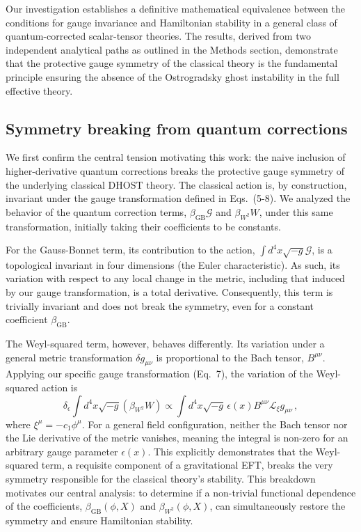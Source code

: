 \documentclass[twocolumn]{aastex631}
\begin{document}
Our investigation establishes a definitive mathematical equivalence between the conditions for gauge invariance and Hamiltonian stability in a general class of quantum-corrected scalar-tensor theories. The results, derived from two independent analytical paths as outlined in the Methods section, demonstrate that the protective gauge symmetry of the classical theory is the fundamental principle ensuring the absence of the Ostrogradsky ghost instability in the full effective theory.

\subsection{Symmetry breaking from quantum corrections}

We first confirm the central tension motivating this work: the naive inclusion of higher-derivative quantum corrections breaks the protective gauge symmetry of the underlying classical DHOST theory. The classical action is, by construction, invariant under the gauge transformation defined in Eqs.~(5-8). We analyzed the behavior of the quantum correction terms, $\beta_{\text{GB}}\mathcal{G}$ and $\beta_{W^2}W$, under this same transformation, initially taking their coefficients to be constants.

For the Gauss-Bonnet term, its contribution to the action, $\int d^4x \sqrt{-g} \mathcal{G}$, is a topological invariant in four dimensions (the Euler characteristic). As such, its variation with respect to any local change in the metric, including that induced by our gauge transformation, is a total derivative. Consequently, this term is trivially invariant and does not break the symmetry, even for a constant coefficient $\beta_{\text{GB}}$.

The Weyl-squared term, however, behaves differently. Its variation under a general metric transformation $\delta g_{\mu\nu}$ is proportional to the Bach tensor, $B^{\mu\nu}$. Applying our specific gauge transformation (Eq.~7), the variation of the Weyl-squared action is
\begin{equation}
    \delta_\epsilon \int d^4x \sqrt{-g} (\beta_{W^2} W) \propto \int d^4x \sqrt{-g} \, \epsilon(x) B^{\mu\nu} \mathcal{L}_{\xi} g_{\mu\nu} \,,
\end{equation}
where $\xi^\mu = -c_1 \phi^\mu$. For a general field configuration, neither the Bach tensor nor the Lie derivative of the metric vanishes, meaning the integral is non-zero for an arbitrary gauge parameter $\epsilon(x)$. This explicitly demonstrates that the Weyl-squared term, a requisite component of a gravitational EFT, breaks the very symmetry responsible for the classical theory's stability. This breakdown motivates our central analysis: to determine if a non-trivial functional dependence of the coefficients, $\beta_{\text{GB}}(\phi, X)$ and $\beta_{W^2}(\phi, X)$, can simultaneously restore the symmetry and ensure Hamiltonian stability.
\end{document}
